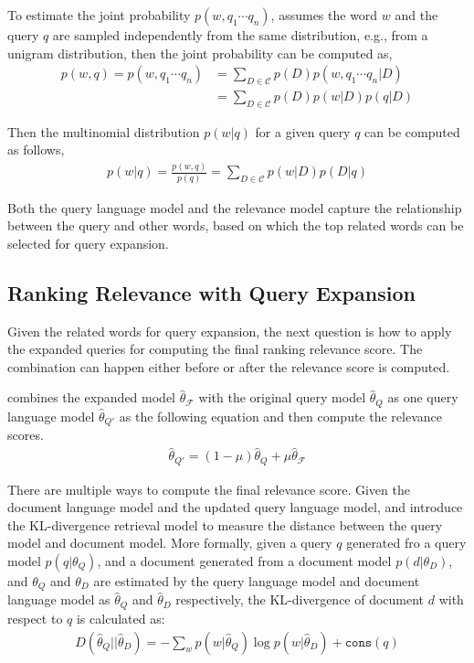 To estimate the joint probability $p(w,q_1 \cdots q_n)$, \cite{Lavrenko-2001} assumes the word $w$ and the query $q$ are sampled independently from the same distribution, e.g., from a unigram distribution, then the joint probability can be computed as,
\begin{align}
p(w, q) = p(w,q_1 \cdots q_n) &= \sum_{D \in \mathcal{C}} p(D) p(w,q_1 \cdots q_n | D) \\
&= \sum_{D \in \mathcal{C}} p(D) p(w|D) p(q | D)
\end{align}

Then the multinomial distribution $p(w|q)$ for a given query $q$ can be computed as follows,
\begin{align}
\label{eq:rm_qe}
p(w|q) = \frac{p(w, q)}{p(q)} = \sum_{D \in \mathcal{C}} p(w|D) p(D|q)
\end{align}

Both the query language model and the relevance model capture the relationship between the query and other words, based on which the top related words can be selected for query expansion.

\subsection{Ranking Relevance with Query Expansion}

Given the related words for query expansion, the next question is how to apply the expanded queries for computing the final ranking relevance score. The combination can happen either before or after the relevance score is computed.

\cite{zhai-01b} combines the expanded model $\hat{\theta}_{\mathcal{F}}$ with the original query model $\hat{\theta}_{Q}$ as one query language model $\hat{\theta}_{Q'} $ as the following equation and then compute the relevance scores.
\begin{align}
\hat{\theta}_{Q'} = (1 - \mu)\hat{\theta}_{Q} + \mu \hat{\theta}_{\mathcal{F}}
\end{align}

There are multiple ways to compute the final relevance score. Given the document language model and the updated query language model,  \cite{Lafferty-2001} and \cite{zhai-01b} introduce the KL-divergence retrieval model to measure the distance between the query model and document model. More formally, given a query $q$ generated fro a query model $p(q|\theta_Q)$, and a document generated from a document model $p(d|\theta_D)$, and $\theta_Q$ and $\theta_D$ are estimated by the query language model and document language model as $\hat{\theta}_Q$ and $\hat{\theta}_D$ respectively, the KL-divergence of document $d$ with respect to $q$ is calculated as:
\begin{align}
D(\hat{\theta}_Q || \hat{\theta}_D) = -\sum_w p(w|\hat{\theta}_Q) \log p(w | \hat{\theta}_D) + \texttt{cons}(q)
\end{align}

